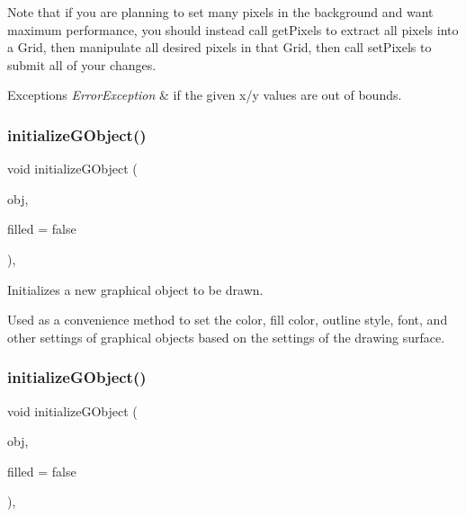 Note that if you are planning to set many pixels in the background and want maximum performance, you should instead call get\+Pixels to extract all pixels into a Grid, then manipulate all desired pixels in that Grid, then call set\+Pixels to submit all of your changes.


\begin{DoxyExceptions}{Exceptions}
{\em Error\+Exception} & if the given x/y values are out of bounds. \\
\hline
\end{DoxyExceptions}
\mbox{\label{classGDrawingSurface_a814498efebc5586645159cd22990cf61}} 
\subsubsection{\texorpdfstring{initialize\+G\+Object()}{initializeGObject()}\hspace{0.1cm}{\footnotesize\ttfamily [1/2]}}
{\footnotesize\ttfamily void initialize\+G\+Object (\begin{DoxyParamCaption}\item[{\mbox{\hyperlink{classGObject}{G\+Object}} \&}]{obj,  }\item[{bool}]{filled = {\ttfamily false} }\end{DoxyParamCaption})\hspace{0.3cm}{\ttfamily [protected]}, {\ttfamily [virtual]}}



Initializes a new graphical object to be drawn. 

Used as a convenience method to set the color, fill color, outline style, font, and other settings of graphical objects based on the settings of the drawing surface. \mbox{\label{classGDrawingSurface_a43e6bc951980da061ddc40407daee227}} 
\subsubsection{\texorpdfstring{initialize\+G\+Object()}{initializeGObject()}\hspace{0.1cm}{\footnotesize\ttfamily [2/2]}}
{\footnotesize\ttfamily void initialize\+G\+Object (\begin{DoxyParamCaption}\item[{\mbox{\hyperlink{classGObject}{G\+Object}} $\ast$}]{obj,  }\item[{bool}]{filled = {\ttfamily false} }\end{DoxyParamCaption})\hspace{0.3cm}{\ttfamily [protected]}, {\ttfamily [virtual]}}



